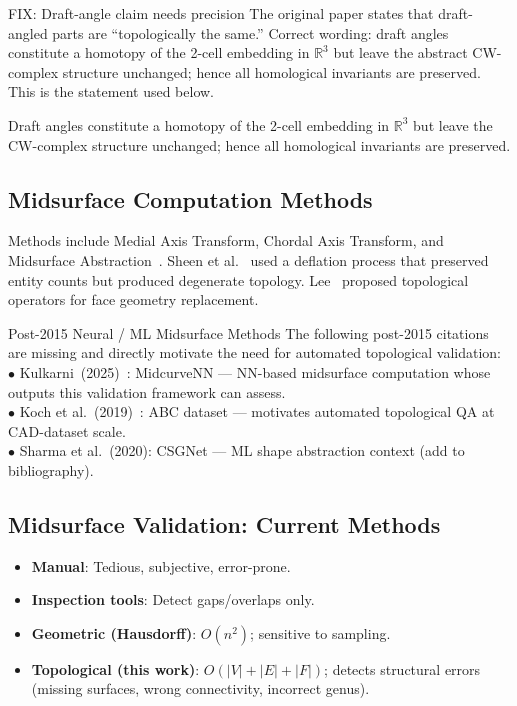 \documentclass[journal,twocolumn,10pt]{IEEEtran}
\begin{document}
\begin{fixblock}{FIX: Draft-angle claim needs precision}
The original paper states that draft-angled parts are ``topologically the
same.'' Correct wording: draft angles constitute a homotopy of the 2-cell
embedding in $\mathbb{R}^3$ but leave the abstract CW-complex structure
unchanged; hence all homological invariants are preserved. This is the
statement used below.
\end{fixblock}

Draft angles constitute a homotopy of the 2-cell embedding in $\mathbb{R}^3$
but leave the CW-complex structure unchanged; hence all homological invariants
are preserved.

\subsection{Midsurface Computation Methods}

Methods include Medial Axis Transform, Chordal Axis Transform, and Midsurface
Abstraction~\cite{Thakur2009}. Sheen et al.~\cite{Sheen2008} used a deflation
process that preserved entity counts but produced degenerate topology.
Lee~\cite{Lee2009a} proposed topological operators for face geometry
replacement.

\begin{refblock}{Post-2015 Neural / ML Midsurface Methods}
The following post-2015 citations are missing and directly motivate the need
for automated topological validation:\smallskip\\
$\bullet$ Kulkarni~(2025)~\cite{MidcurveNN2025}: MidcurveNN --- NN-based
midsurface computation whose outputs this validation framework can assess.\\
$\bullet$ Koch et al.~(2019)~\cite{Koch2019}: ABC dataset --- motivates
automated topological QA at CAD-dataset scale.\\
$\bullet$ Sharma et al.~(2020): CSGNet --- ML shape abstraction context
(add to bibliography).
\end{refblock}

\subsection{Midsurface Validation: Current Methods}

\begin{itemize}[noitemsep,topsep=2pt]
\item \textbf{Manual}: Tedious, subjective, error-prone.
\item \textbf{Inspection tools}: Detect gaps/overlaps only.
\item \textbf{Geometric (Hausdorff)}: $O(n^2)$; sensitive to sampling.
\item \textbf{Topological (this work)}: $O(|V|+|E|+|F|)$; detects structural
      errors (missing surfaces, wrong connectivity, incorrect genus).
\end{itemize}
\end{document}
